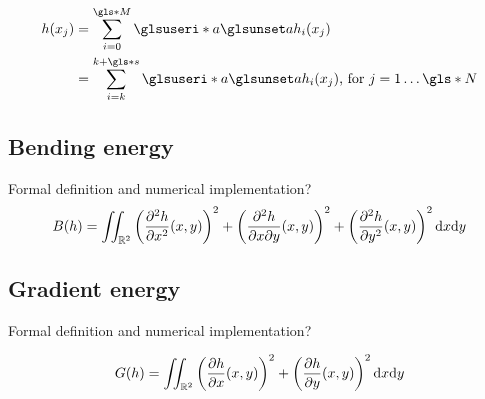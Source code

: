 \begin{align*}
 h(x_j) &= \sum_{i=0}^{\g{M}}\gi{a} h_i(x_j)\\
 &= \sum_{i=k}^{k + \g{s}} \gi{a} h_i(x_j)\text{, for } j = 1 \ldots \g{N}
 \label{test}
\end{align*}

\subsection{Bending energy}

Formal definition and numerical implementation?
\begin{equation}
  B(h) = \iint_{\mathbb{R}^2} 
  \left( \frac{\partial^2 h}{\partial x ^2}(x,y) \right)^2 + 
  \left( \frac{\partial^2 h}{\partial x \partial y}(x,y) \right)^2 + 
  \left( \frac{\partial^2 h}{\partial y ^2}(x,y) \right)^2
  \text{d}x\text{d}y
  \label{eq:basics:bending}
\end{equation}

\subsection{Gradient energy}

Formal definition and numerical implementation?

\begin{equation}
  G(h) = \iint_{\mathbb{R}^2} 
  \left( \frac{\partial h}{\partial x}(x,y) \right)^2 + 
  \left( \frac{\partial h}{\partial y}(x,y) \right)^2
  \text{d}x\text{d}y
  \label{eq:basics:gradient}
\end{equation}


